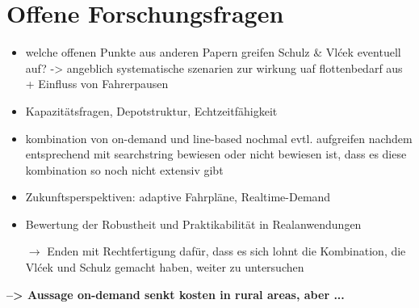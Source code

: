 \section{Offene Forschungsfragen}
\label{sec:2.3}
\label{sec:OffeneForschungsfragen}
\begin{itemize}
    \item welche offenen Punkte aus anderen Papern greifen Schulz \& Vlćek eventuell auf? -> angeblich systematische szenarien zur wirkung uaf flottenbedarf aus \textcite{vansteenwegen_survey_2022} + Einfluss von Fahrerpausen
    \item Kapazitätsfragen, Depotstruktur, Echtzeitfähigkeit
    \item kombination von on-demand und line-based nochmal evtl. aufgreifen nachdem entsprechend mit searchstring bewiesen oder nicht bewiesen ist, dass es diese kombination so noch nicht extensiv gibt
    \item Zukunftsperspektiven: adaptive Fahrpläne, Realtime-Demand
    \item Bewertung der Robustheit und Praktikabilität in Realanwendungen
    
    $\rightarrow$ Enden mit Rechtfertigung dafür, dass es sich lohnt die Kombination, die Vlćek und Schulz gemacht haben, weiter zu untersuchen
\end{itemize}

\textbf{--> Aussage on-demand senkt kosten in rural areas, aber ...}

